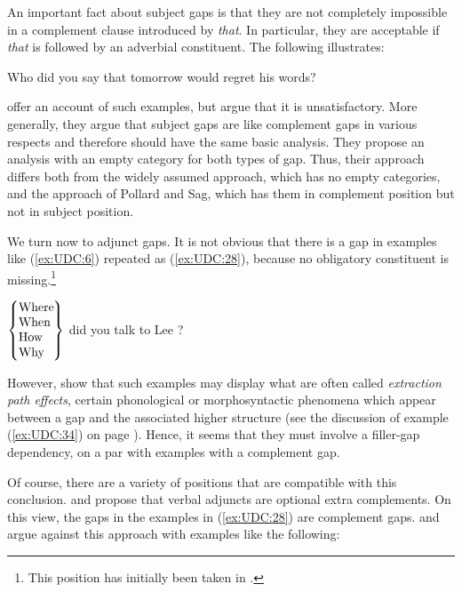 \documentclass[output=paper
,notxmath 
 	        ,biblatex
                ,babelshorthands
                ,newtxmath
                ,draftmode
                ,colorlinks, citecolor=brown
]{langscibook}
\begin{document}
An important fact about subject gaps is that they are not completely
impossible in a complement clause introduced by \emph{that}. In
particular, they are acceptable if \emph{that} is followed by an
adverbial constituent. The following illustrates:

\begin{exe}
\ex \label{ex:UDC:27}
Who did you say that tomorrow \trace{} would regret his words?
\end{exe}

\noindent
\citet[Chapter~5.1.3]{Ginzburg:Sag:01} offer an account of such examples, but
\citet[Chapter~2.3.2]{Levine:Hukari:06} argue that it is unsatisfactory. More generally, they
argue that subject gaps are like complement gaps in various respects
and therefore should have the same basic analysis. They propose an
analysis with an empty category for both types of gap. Thus, their
approach differs both from the widely assumed approach, which has no
empty categories, and the approach of Pollard and Sag, which has them
in complement position but not in subject position.\label{udc:page-subject-gaps-end}

We turn now to adjunct gaps. It is not obvious that there is a gap in
examples like (\ref{ex:UDC:6}) repeated as (\ref{ex:UDC:28}), because
no obligatory constituent is missing.\footnote{This position has initially
  been taken in \citet[176--180]{Pollard:Sag:94}. } 

\ea
\label{ex:UDC:28}
$\begin{array}{@{}l@{}}
\left\{%
\begin{tabular}{@{}l@{}}
  Where\hspace{-.09em}\mbox{}\\
  When\\
  How\\
  Why\\
\end{tabular}\right\}
\end{array}$
did you talk to Lee \trace{}?
\z

\noindent
However, \cite{hukari.levine:adjunct} show that such examples may display
what are often called \emph{extraction path effects}, certain phonological or
morphosyntactic phenomena which appear between a gap and the associated
higher structure (see the discussion of example (\ref{ex:UDC:34}) on
page \pageref{ex:UDC:34}). Hence, it seems that they must
involve a filler-gap dependency, on a par with examples with a
complement gap.

Of course, there are a variety of positions that are compatible with
this conclusion. \citet[]{Bouma:Malouf:Sag:01} and \citet[168,
fn.~2]{Ginzburg:Sag:01} propose that verbal adjuncts are optional
extra complements.  On this view, the gaps in the examples in
(\ref{ex:UDC:28}) are complement gaps.  \citet{Levine:03} and
\citet[Chapter~3.5--3.6]{Levine:Hukari:06} argue against this approach with examples
like the following:
\end{document}
